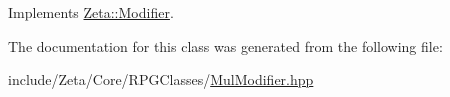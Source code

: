 Implements \hyperlink{classZeta_1_1Modifier_a43bf640dc0ed6404e42469f073759b32}{Zeta\+::\+Modifier}.



The documentation for this class was generated from the following file\+:\begin{DoxyCompactItemize}
\item 
include/\+Zeta/\+Core/\+R\+P\+G\+Classes/\hyperlink{MulModifier_8hpp}{Mul\+Modifier.\+hpp}\end{DoxyCompactItemize}
